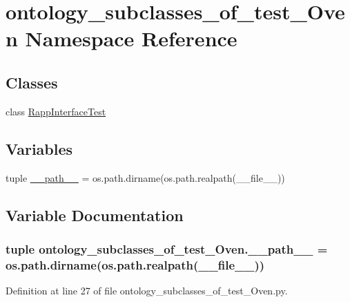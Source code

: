 \hypertarget{namespaceontology__subclasses__of__test__Oven}{\section{ontology\-\_\-subclasses\-\_\-of\-\_\-test\-\_\-\-Oven Namespace Reference}
\label{namespaceontology__subclasses__of__test__Oven}
}
\subsection*{Classes}
\begin{DoxyCompactItemize}
\item 
class \hyperlink{classontology__subclasses__of__test__Oven_1_1RappInterfaceTest}{Rapp\-Interface\-Test}
\end{DoxyCompactItemize}
\subsection*{Variables}
\begin{DoxyCompactItemize}
\item 
tuple \hyperlink{namespaceontology__subclasses__of__test__Oven_ac171e644ff04c3f68de1f3920262f952}{\-\_\-\-\_\-path\-\_\-\-\_\-} = os.\-path.\-dirname(os.\-path.\-realpath(\-\_\-\-\_\-file\-\_\-\-\_\-))
\end{DoxyCompactItemize}


\subsection{Variable Documentation}
\hypertarget{namespaceontology__subclasses__of__test__Oven_ac171e644ff04c3f68de1f3920262f952}{
\subsubsection[{\-\_\-\-\_\-path\-\_\-\-\_\-}]{\setlength{\rightskip}{0pt plus 5cm}tuple ontology\-\_\-subclasses\-\_\-of\-\_\-test\-\_\-\-Oven.\-\_\-\-\_\-path\-\_\-\-\_\- = os.\-path.\-dirname(os.\-path.\-realpath(\-\_\-\-\_\-file\-\_\-\-\_\-))}}\label{namespaceontology__subclasses__of__test__Oven_ac171e644ff04c3f68de1f3920262f952}


Definition at line 27 of file ontology\-\_\-subclasses\-\_\-of\-\_\-test\-\_\-\-Oven.\-py.

